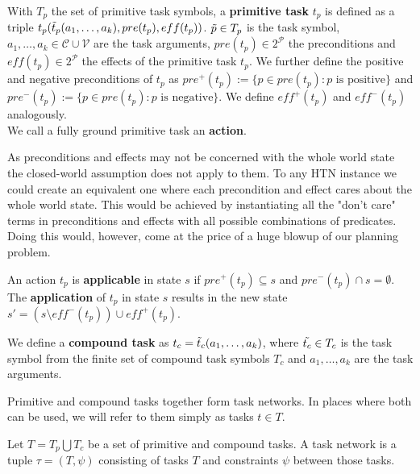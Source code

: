 \begin{definition} %
	With $T_p$ the set of primitive task symbols, a \textbf{primitive task} $t_p$ is defined as a triple $t_p(\Tilde{t}_p (a_1, \ldots, a_k), pre(t_p), eff(t_p))$. $\Tilde{p} \in T_p$ is the task symbol, $a_1, \ldots, a_k \in \mathcal{C} \cup \mathcal{V}$ are the task arguments, $pre(t_p) \in 2^{\mathcal{P}}$ the preconditions and $eff(t_p) \in 2^{\mathcal{P}}$ the effects of the primitive task $t_p$. We further define the positive and negative preconditions of $t_p$ as $pre^+(t_p) := \{p \in pre(t_p) : p \text{ is positive}\}$ and $pre^-(t_p) := \{p \in pre(t_p) : p \text{ is negative}\}$. We define $eff^+(t_p)$ and $eff^-(t_p)$ analogously. \\
	We call a fully ground primitive task an \textbf{action}.
\end{definition}

As preconditions and effects may not be concerned with the whole world state the closed-world assumption does not apply to them. To any HTN instance we could create an equivalent one where each precondition and effect cares about the whole world state. This would be achieved by instantiating all the "don't care" terms in preconditions and effects with all possible combinations of predicates. Doing this would, however, come at the price of a huge blowup of our planning problem. \\

\begin{definition} %
	An action $t_p$ is \textbf{applicable} in state $s$ if $pre^+(t_p) \subseteq s$ and $pre^-(t_p) \cap s = \emptyset$. The \textbf{application} of $t_p$ in state $s$ results in the new state $s' = (s \setminus eff^-(t_p)) \cup eff^+(t_p)$.
\end{definition}

\begin{definition} %
	We define a \textbf{compound task} as $t_c = \Tilde{t}_c(a_1, \ldots, a_k)$, where $\Tilde{t_c} \in T_c$ is the task symbol from the finite set of compound task symbols $T_c$ and $a_1, \ldots, a_k$ are the task arguments.
\end{definition}
Primitive and compound tasks together form task networks. In places where both can be used, we will refer to them simply as tasks $t \in T$.

\begin{definition} %
	Let $T = T_p \bigcup T_c$ be a set of primitive and compound tasks. A task network is a tuple $\tau = (T, \psi)$ consisting of tasks $T$ and constraints $\psi$ between those tasks.
\end{definition}

